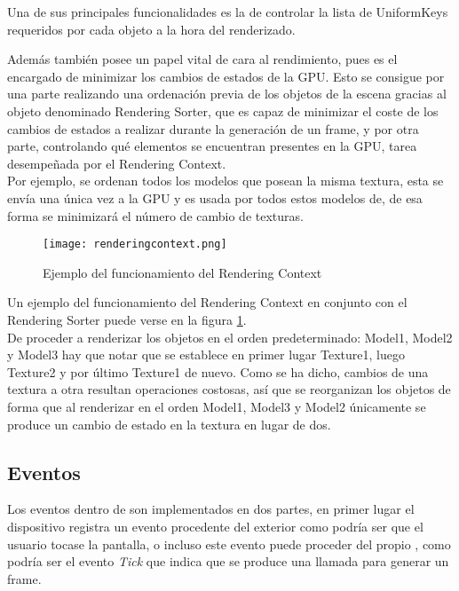 Una de sus principales funcionalidades es la de controlar la lista de UniformKeys requeridos por cada objeto a la hora del renderizado.

Además también posee un papel vital de cara al rendimiento, pues es el encargado de minimizar los cambios de estados de la GPU. Esto se consigue por una parte realizando una ordenación previa de los objetos de la escena gracias al objeto denominado Rendering Sorter, que es capaz de minimizar el coste de los cambios de estados a realizar durante la generación de un frame, y por otra parte, controlando qué elementos se encuentran presentes en la GPU, tarea desempeñada por el Rendering Context.\\

Por ejemplo, se ordenan todos los modelos que posean la misma textura, esta se envía una única vez a la GPU y es usada por todos estos modelos de, de esa forma se minimizará el número de cambio de texturas.\\

\begin{figure}[h!]
\begin{center}
\texttt{[image: renderingcontext.png]}
\end{center}
\caption[Ejemplo del funcionamiento del Rendering Context]{Ejemplo del funcionamiento del Rendering Context}
\label{fig:renderingcontext}
\end{figure}

Un ejemplo del funcionamiento del Rendering Context en conjunto con el Rendering Sorter puede verse en la figura \ref{fig:renderingcontext}.\\
De proceder a renderizar los objetos en el orden predeterminado: Model1, Model2 y Model3 hay que notar que se establece en primer lugar Texture1, luego Texture2 y por último Texture1 de nuevo. Como se ha dicho, cambios de una textura a otra resultan operaciones costosas, así que se reorganizan los objetos de forma que al renderizar en el orden Model1, Model3 y Model2 únicamente se produce un cambio de estado en la textura en lugar de dos.

\subsection{Eventos}
Los eventos dentro de \robotto son implementados en dos partes, en primer lugar el dispositivo registra un evento procedente del exterior como podría ser que el usuario tocase la pantalla, o incluso este evento puede proceder del propio \robotto, como podría ser el evento \textit{Tick} que indica que se produce una llamada para generar un frame.\\

